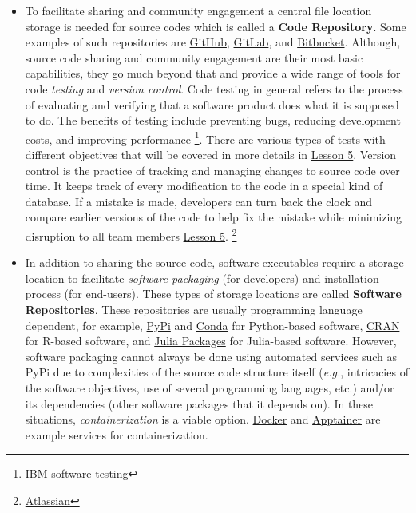 \documentclass[
  letterpaper,
  DIV=11,
  numbers=noendperiod]{scrreport}
\begin{document}
\begin{itemize}
\item
  To facilitate sharing and community engagement a central file location
  storage is needed for source codes which is called a \textbf{Code
  Repository}. Some examples of such repositories are
  \href{https://github.com/}{GitHub},
  \href{https://about.gitlab.com/}{GitLab}, and
  \href{https://bitbucket.org/product/}{Bitbucket}. Although, source
  code sharing and community engagement are their most basic
  capabilities, they go much beyond that and provide a wide range of
  tools for code \emph{testing} and \emph{version control}. Code testing
  in general refers to the process of evaluating and verifying that a
  software product does what it is supposed to do. The benefits of
  testing include preventing bugs, reducing development costs, and
  improving performance \footnote{\href{https://www.ibm.com/topics/software-testing}{IBM
    software testing}}. There are various types of tests with different
  objectives that will be covered in more details in \href{link}{Lesson
  5}. Version control is the practice of tracking and managing changes
  to source code over time. It keeps track of every modification to the
  code in a special kind of database. If a mistake is made, developers
  can turn back the clock and compare earlier versions of the code to
  help fix the mistake while minimizing disruption to all team members
  \href{link}{Lesson 5}. \footnote{\href{https://www.atlassian.com/git/tutorials/what-is-version-control}{Atlassian}}
\item
  In addition to sharing the source code, software executables require a
  storage location to facilitate \emph{software packaging} (for
  developers) and installation process (for end-users). These types of
  storage locations are called \textbf{Software Repositories}. These
  repositories are usually programming language dependent, for example,
  \href{https://pypi.org/}{PyPi} and \href{https://docs.conda.io}{Conda}
  for Python-based software, \href{https://cran.r-project.org/}{CRAN}
  for R-based software, and \href{https://juliapackages.com/}{Julia
  Packages} for Julia-based software. However, software packaging cannot
  always be done using automated services such as PyPi due to
  complexities of the source code structure itself (\emph{e.g.},
  intricacies of the software objectives, use of several programming
  languages, etc.) and/or its dependencies (other software packages that
  it depends on). In these situations, \emph{containerization} is a
  viable option. \href{https://www.docker.com/}{Docker} and
  \href{https://apptainer.org/}{Apptainer} are example services for
  containerization.
\end{itemize}
\end{document}
